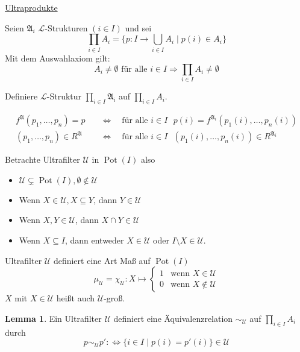 \documentclass[12pt,parskip=full]{scrartcl}
\newcommand{\heading}{\underline}
\theoremstyle{definition}
\newtheorem{lemma}[theorem]{Lemma}
\begin{document}
	\heading{Ultraprodukte}

	Seien $\mathfrak{A}_i$ $\mathcal{L}$-Strukturen $(i \in I)$ und sei
	\begin{equation*}
		\prod_{i \in I} A_i = \{ p: I \to \bigcup_{i \in I} A_i \mid p(i) \in A_i \}
	\end{equation*}
	Mit dem Auswahlaxiom gilt:
	\begin{equation*}
		A_i \neq \emptyset \text{ für alle $i \in I$} \Rightarrow \prod_{i \in I} A_i \neq \emptyset
	\end{equation*}
	
	Definiere $\mathcal{L}$-Struktur $\prod_{i \in I} \mathfrak{A}_i$ auf $\prod_{i \in I} A_i$.
	
	\begin{align*}
		f^\mathfrak{A}(p_1, \dots, p_n) = p \quad&\Leftrightarrow\quad \text{für alle $i \in I$ } p(i) =  f^{\mathfrak{A}_i}(p_1(i), \dots, p_n(i)) \\
		(p_1, \dots, p_n) \in R^\mathfrak{A} \quad&\Leftrightarrow\quad \text{für alle $i \in I$ } (p_1(i), \dots, p_n(i)) \in R^{\mathfrak{A}_i}
	\end{align*}
	
	Betrachte Ultrafilter $\mathcal{U}$ in $\operatorname{Pot}(I)$ also
	\begin{itemize}
		\item $\mathcal{U} \subsetneq \operatorname{Pot}(I), \emptyset \notin \mathcal{U}$
		\item Wenn $X \in \mathcal{U}, X \subseteq Y$, dann $Y \in \mathcal{U}$
		\item Wenn $X,Y \in \mathcal{U}$, dann $X \cap Y \in \mathcal{U}$
		\item Wenn $X \subseteq I$, dann entweder $X \in \mathcal{U}$ oder $I \setminus X \in \mathcal{U}$.
	\end{itemize}

	Ultrafilter $\mathcal{U}$ definiert eine Art Maß auf $\operatorname{Pot}(I)$
	\begin{equation*}
		\mu_\mathcal{U} = \chi_\mathcal{U}: X \mapsto \begin{cases}
			1 & \text{wenn $X \in \mathcal{U}$} \\
			0 & \text{wenn $X \notin \mathcal{U}$}
		\end{cases}
	\end{equation*}
	$X$ mit $X \in \mathcal{U}$ heißt auch $\mathcal{U}$-groß.
	
	\begin{lemma}
		Ein Ultrafilter $\mathcal{U}$ definiert eine Äquivalenzrelation $\sim_\mathcal{U}$ auf $\prod_{i \in I} A_i$ durch
		\begin{equation*}
			p \sim_\mathcal{U} p' :\Leftrightarrow \{ i \in I \mid p(i) = p'(i) \} \in \mathcal{U}
		\end{equation*}
	\end{lemma}
\end{document}
